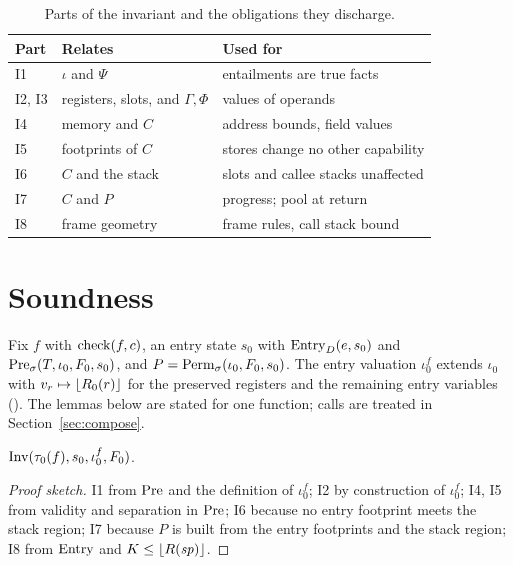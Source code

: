 \begin{table}[t]
\caption{Parts of the invariant and the obligations they discharge.}
\label{tab:inv}
\centering\small
\begin{tabular}{@{}lll@{}}
\toprule
Part & Relates & Used for\\
\midrule
I1 & $\iota$ and $\Psi$ & entailments are true facts\\
I2, I3 & registers, slots, and $\Gamma,\Phi$ & values of operands\\
I4 & memory and $C$ & address bounds, field values\\
I5 & footprints of $C$ & stores change no other capability\\
I6 & $C$ and the stack & slots and callee stacks unaffected\\
I7 & $C$ and $P$ & progress; pool at return\\
I8 & frame geometry & frame rules, call stack bound\\
\bottomrule
\end{tabular}
\end{table}

\section{Soundness}\label{sec:soundness}
Fix $f$ with $\mathrm{check}(f,c)$, an entry state $s_0$ with $\mathrm{Entry}_D(e,s_0)$ and $\mathrm{Pre}_\sigma(T,\iota_0,F_0,s_0)$, and $P=\mathrm{Perm}_\sigma(\iota_0,F_0,s_0)$. The entry valuation $\iota_0^f$ extends $\iota_0$ with $v_r\mapsto\lfloor R_0(r)\rfloor$ for the preserved registers and the remaining entry variables (). The lemmas below are stated for one function; calls are treated in Section~\ref{sec:compose}.

\begin{lem}\label{lem:init}
$\mathrm{Inv}(\tau_0(f),s_0,\iota_0^f,F_0)$.
\end{lem}
\begin{proof}[Proof sketch]
I1 from $\mathrm{Pre}$ and the definition of $\iota_0^f$; I2 by construction of $\iota_0^f$; I4, I5 from validity and separation in $\mathrm{Pre}$; I6 because no entry footprint meets the stack region; I7 because $P$ is built from the entry footprints and the stack region; I8 from $\mathrm{Entry}$ and $K\le\lfloor R(\mathit{sp})\rfloor$.
\end{proof}

